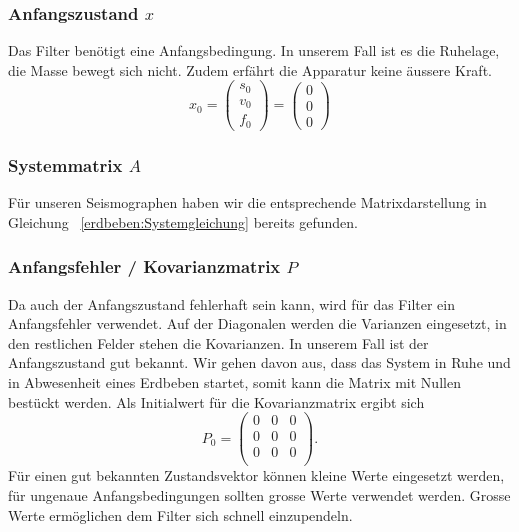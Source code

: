 \subsubsection*{Anfangszustand $x$}

Das Filter benötigt eine Anfangsbedingung. 
In unserem Fall ist es die Ruhelage, die Masse bewegt sich nicht. 
Zudem erfährt die Apparatur keine äussere Kraft.
\[ {x_0 }= \left( \begin{array}{c} {s_0}\\ {v_0}\\{f_0}\end{array}\right) = \left( \begin{array}{c} 0\\ 0\\ 0\end{array}\right) \]

\subsubsection*{Systemmatrix $A$}
Für unseren Seismographen haben wir die entsprechende Matrixdarstellung in Gleichung ~\eqref{erdbeben:Systemgleichung} bereits gefunden. 

\subsubsection*{Anfangsfehler / Kovarianzmatrix $P$}
Da auch der Anfangszustand fehlerhaft sein kann, wird für das Filter ein Anfangsfehler verwendet. 
Auf der Diagonalen werden die Varianzen eingesetzt, in den restlichen Felder stehen die Kovarianzen.
In unserem Fall ist der Anfangszustand gut bekannt. 
Wir gehen davon aus, dass das System in Ruhe und in Abwesenheit eines Erdbeben startet, somit kann die Matrix mit Nullen bestückt werden. 
Als Initialwert für die Kovarianzmatrix ergibt sich
\[ 
{P_0 }=
\left(
\begin{array}{ccc} 	
0 & 0 &0 \\ 
0 &0 & 0 \\ 
0 & 0 &0 \\
\end{array}
\right).
 \] 
Für einen gut bekannten Zustandsvektor können kleine Werte eingesetzt werden, für ungenaue Anfangsbedingungen sollten grosse Werte verwendet werden. 
Grosse Werte ermöglichen dem Filter sich schnell einzupendeln. 



